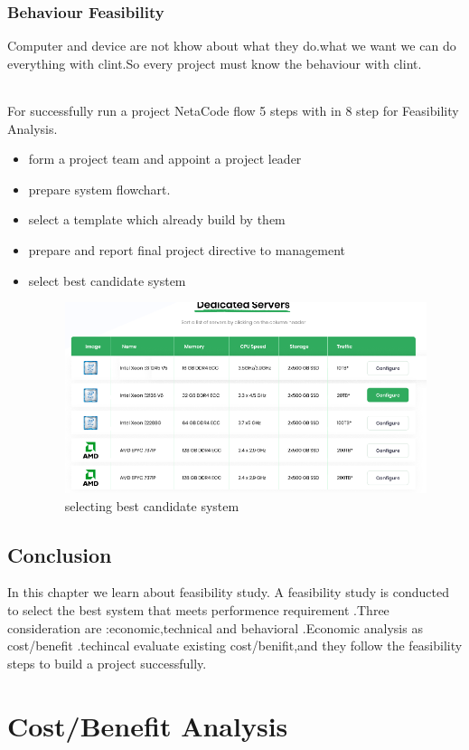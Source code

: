 \documentclass[a4paper,12pt]{report}
\begin{document}
\subsection{Behaviour Feasibility}
Computer and device are not khow about what they do.what we want we can do everything with clint.So every project must know the behaviour with clint.
\subparagraph{}
For successfully run a project NetaCode flow 5 steps with in 8 step for Feasibility Analysis.
\begin{itemize}
	\item form a project team and appoint a project leader
	\item prepare system flowchart.
	\item select a template which  already build by them
	\item prepare and report final project directive to management
	\item select best candidate system
	\begin{figure}[h]
		\centering
		\includegraphics[width=0.9\linewidth]{7_3}
		\caption{selecting best candidate system}
		\label{fig:73}
	\end{figure}
\end{itemize}
\section{Conclusion}
In this chapter we learn about feasibility study.
A feasibility study is conducted to select the best system that meets performence requirement .Three consideration are :economic,technical and behavioral .Economic analysis as cost/benefit .techincal evaluate existing cost/benifit,and they follow the feasibility steps to build a project successfully.





\chapter{Cost/Benefit Analysis}
\end{document}
